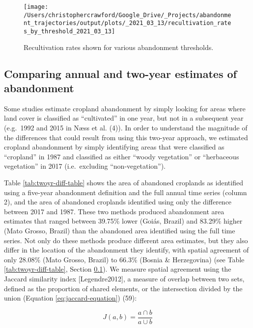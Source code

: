 \documentclass[9pt,twocolumn,twoside,lineno]{pnas-new}
\begin{document}
\begin{figure}
\texttt{[image: /Users/christophercrawford/Google\_Drive/\_Projects/abandonment\_trajectories/output/plots/\_2021\_03\_13/recultivation\_rates\_by\_threshold\_2021\_03\_13]} \caption{Recultivation rates shown for various abandonment thresholds.}\label{fig:recult-by-threshold}
\end{figure}

\hypertarget{twoyr-vs-annual}{%
\subsection{Comparing annual and two-year estimates of abandonment}\label{twoyr-vs-annual}}

Some studies estimate cropland abandonment by simply looking for areas where land cover is classified as ``cultivated'' in one year, but not in a subsequent year (e.g.~1992 and 2015 in Næss et al. (4)).
In order to understand the magnitude of the differences that could result from using this two-year approach, we estimated cropland abandonment by simply identifying areas that were classified as ``cropland'' in 1987 and classified as either ``woody vegetation'' or ``herbaceous vegetation'' in 2017 (i.e.~excluding ``non-vegetation'').

Table \ref{tab:twoyr-diff-table} shows the area of abandoned croplands as identified using a five-year abandonment definition and the full annual time series (column 2), and the area of abandoned croplands identified using only the difference between 2017 and 1987.
These two methods produced abandonment area estimates that ranged between 39.75\% lower (Goiás, Brazil) and 83.29\% higher (Mato Grosso, Brazil) than the abandoned area identified using the full time series.
Not only do these methods produce different area estimates, but they also differ in the location of the abandonment they identify, with spatial agreement of only 28.08\% (Mato Grosso, Brazil) to 66.3\% (Bosnia \& Herzegovina) (see Table \ref{tab:twoyr-diff-table}, Section \ref{twoyr-vs-annual}).
We measure spatial agreement using the Jaccard similarity index {[}Legendre2012{]}, a measure of overlap between two sets, defined as the proportion of shared elements, or the intersection divided by the union (Equation \eqref{eq:jaccard-equation}) (59):

\begin{equation}
J(a,b) = \frac{a\cap b}{a\cup b} \label{eq:jaccard-equation}
\end{equation}
\end{document}
